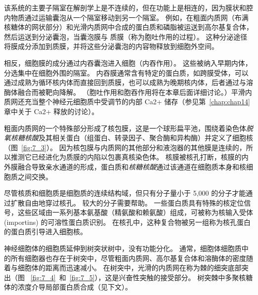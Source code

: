 该系统的主要子隔室在解剖学上是不连续的，但在功能上是相连的，因为膜状和腔内物质通过运输囊泡从一个隔室移动到另一个隔室。
例如，在粗面内质网（布满核糖体的网状部分）和光滑内质网中合成的蛋白质和磷脂被运送到高尔基复合体，然后运送到分泌囊泡，当囊泡膜与 质膜（称为胞吐作用的过程）。
这种分泌途径将膜成分添加到质膜，并将这些分泌囊泡的内容物释放到细胞外空间。


相反，细胞膜的成分通过内吞囊泡进入细胞（内吞作用）。
这些被纳入早期内体，分选集中在细胞外围的隔室。
内吞膜通常含有特定的蛋白质，如跨膜受体，可以通过成熟为循环核内体而直接回到质膜，也可以成熟为晚期核内体，后者通过与溶酶体融合而被靶向降解。
（胞吐作用和胞吞作用将在本章后面详细讨论。）平滑内质网还充当整个神经元细胞质中受调节的内部 Ca2+ 储存（参见第~\ref{chap:chap14} 章中关于 Ca2+ 释放的讨论）。


粗面内质网的一个特殊部分形成了核包膜，这是一个球形扁平池，围绕着染色体\textit{脱氧核糖核酸}及其相关蛋白（组蛋白、转录因子、聚合酶和异构酶）并定义了细胞核（图~\ref{fig:7_3}）。 
因为核包膜与内质网的其他部分和液泡器的其他膜是连续的，所以推测它已经进化为质膜的内陷以包裹真核染色体。
核膜被核孔打断，核膜的内外膜融合导致亲水通道的形成，蛋白质和\textit{核糖核酸}通过该通道在细胞质本身和核细胞质之间交换。


尽管核质和细胞质是细胞质的连续结构域，但只有分子量小于 5,000 的分子才能通过扩散自由地穿过核孔。
较大的分子需要帮助。
一些蛋白质具有特殊的核定位信号，这些区域由一系列基本氨基酸（精氨酸和赖氨酸）组成，可被称为核输入受体 (importins) 的可溶性蛋白质识别。
在核孔中，这种复合物被另一组称为核孔蛋白的蛋白质引导进入细胞核。


神经细胞体的细胞质延伸到树突状树中，没有功能分化。 
通常，细胞体细胞质中的所有细胞器也存在于树突中，尽管粗面内质网、高尔基复合体和溶酶体的密度随着与细胞体的距离而迅速减小。 
在树突中，光滑的内质网在称为棘的细突底部突出（图 ~\ref{fig:7_4}~和~\ref{fig:7_5}），这是兴奋性突触的接受部分。
树突棘中多聚核糖体的浓度介导局部蛋白质合成（见下文）。


